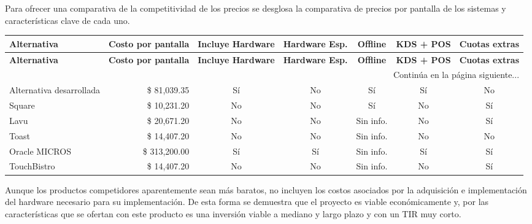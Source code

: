 Para ofrecer una comparativa de la competitividad de los precios se desglosa la comparativa de precios por pantalla de los sistemas y características clave de cada uno.

\begingroup
\setlength{\LTleft}{\fill}
\setlength{\LTright}{\fill}

\begin{tabularx}{\textwidth}{X r c c c c c}
\caption{Comparativa de costos por 1 año.} \label{tab:comparativa_costos_1_ano}\\
\toprule
\textbf{Alternativa} & \textbf{Costo por pantalla} & \textbf{Incluye Hardware} & \textbf{Hardware Esp.} & \textbf{Offline} & \textbf{KDS + POS} & \textbf{Cuotas extras} \\
\midrule
\endfirsthead

\toprule
\textbf{Alternativa} & \textbf{Costo por pantalla} & \textbf{Incluye Hardware} & \textbf{Hardware Esp.} & \textbf{Offline} & \textbf{KDS + POS} & \textbf{Cuotas extras} \\
\midrule
\endhead

\midrule
\multicolumn{7}{r}{\small Continúa en la página siguiente...} \\
\endfoot
\bottomrule
\endlastfoot

Alternativa desarrollada & \$ 81,039.35 & Sí & No & Sí & Sí & No \\
\addlinespace
Square & \$ 10,231.20 & No & No & Sí & No & Sí \\
\addlinespace
Lavu & \$ 20,671.20 & No & No & Sin info. & No & Sí \\
\addlinespace
Toast & \$ 14,407.20 & No & No & Sin info. & No & No \\
\addlinespace
Oracle MICROS & \$ 313,200.00 & Sí & Sí & Sin info. & Sí & Sí \\
\addlinespace
TouchBistro & \$ 14,407.20 & No & No & Sin info. & No & Sí \\
\end{tabularx}
\endgroup

Aunque los productos competidores aparentemente sean más baratos, no incluyen los costos asociados por la adquisición e implementación del hardware necesario para su implementación. De esta forma se demuestra que el proyecto es viable económicamente y, por las características que se ofertan con este producto es una inversión viable a mediano y largo plazo y con un TIR muy corto.